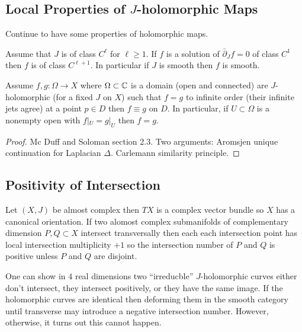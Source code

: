 \documentclass[12pt]{article}
\newcommand{\dbar}{\bar{\partial}}
\begin{document}
\subsection{Local Properties of $J$-holomorphic Maps}

Continue to have some properties of holomorphic maps.

\begin{theorem}
Assume that $J$ is of class $C^\ell$ for $\ell \ge 1$. If $f$ is a solution of $\dbar_J f = 0$ of class $C^1$ then $f$ is of class $C^{\ell+1}$. In particular if $J$ is smooth then $f$ is smooth. 
\end{theorem}

\begin{prop}
Assume $f, g : \Omega \to X$ where $\Omega \subset \mathbb{C}$ is a domain (open and connected) are $J$-holomorphic (for a fixed $J$ on $X$) such that $f = g$ to infinite order (their infinite jets agree) at a point $p \in D$ then $f \equiv g$ on $D$. In particular, if $U \subset \Omega$ is a nonempty open with $f|_U = g|_U$ then $f = g$. 
\end{prop}

\begin{proof}
Mc Duff and Soloman section 2.3. Two arguments: Aromsjen unique continuation for Laplacian $\Delta$. Carlemann similarity principle. 
\end{proof}

\subsection{Positivity of Intersection}

Let $(X, J)$ be almost complex then $TX$ is a complex vector bundle so $X$ has a canonical orientation. If two alomost complex submanifolds of complementary dimension $P, Q \subset X$ intersect transversally then each each intersection point has local intersection multiplicity $+1$ so the intersection number of $P$ and $Q$ is positive unless $P$ and $Q$ are disjoint. 

\begin{rmk}
One can show in $4$ real dimensions two ``irreducble'' $J$-holomorphic curves either don't intersect, they intersect positively, or they have the same image. If the holomorphic curves are identical then deforming them in the smooth category until transverse may introduce a negative intersection number. However, otherwise, it turns out this cannot happen. 
\end{rmk}
\end{document}
